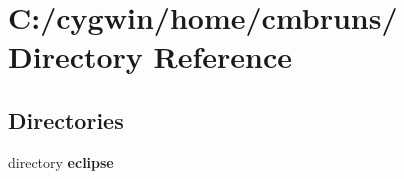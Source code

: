\section{C:/cygwin/home/cmbruns/ Directory Reference}
\label{dir_000002}
\subsection*{Directories}
\begin{CompactItemize}
\item 
directory {\bf eclipse}
\end{CompactItemize}
